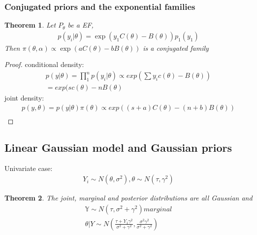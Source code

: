 \documentclass[a4paper,12pt, oneside, fleqn]{book}
\newtheorem{theorem}{Theorem}[section]
\theoremstyle{definition}
\theoremstyle{remark}
\begin{document}
\subsubsection*{Conjugated priors and the exponential families}



\begin{theorem}
	Let $P_\theta$ be a EF, 
	\begin{align*}
		p(y_i|\theta) = \exp(y_1 C(\theta) - B(\theta)) p_1(y_1)
	\end{align*}
	Then $\pi(\theta, \alpha) \propto \exp(a C(\theta) - b B(\theta))$ is a conjugated family
\end{theorem}
\begin{proof}
	conditional density:
	\begin{align*}
		p(y|\theta) = \prod_1^n p(y_i|\theta) \propto exp(\sum y_i c(\theta) - B(\theta))\\
		= exp(sc(\theta) - nB(\theta)
	\end{align*}
	joint density:
	\begin{align*}
		p(y, \theta) = p(y|\theta) \pi(\theta) \propto exp((s+a)C(\theta) - (n+b)B(\theta))\\
	\end{align*}
\end{proof}

\subsection{Linear Gaussian model and Gaussian priors}

Univariate case:
\begin{align*}
	Y_i \sim N(\theta, \sigma^2), \theta \sim N(\tau, \gamma^2)
\end{align*}

\begin{theorem}
	The joint, marginal and posterior distributions are all Gaussian and 
	\begin{align*}
		\mathbb{Y} \sim N(\tau, \sigma^2 + \gamma^2) marginal\\
		\theta|Y \sim N(\frac{\tau + Y_1 \gamma^2}{\sigma^2 + \gamma^2}, \frac{\sigma^2 \gamma^2}{\sigma^2 + \gamma^2})
	\end{align*}
\end{theorem}
\end{document}
